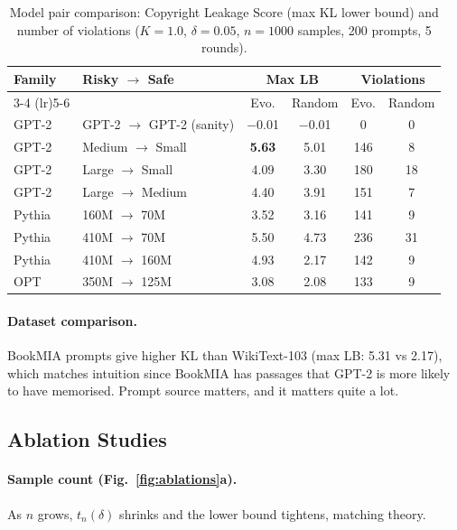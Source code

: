 \documentclass{article}
\begin{document}
\begin{table}[t]
\centering
\caption{Model pair comparison: Copyright Leakage Score (max KL lower bound) and number of violations ($K=1.0$, $\delta=0.05$, $n=1000$ samples, 200 prompts, 5 rounds).}
\label{tab:modelpairs}
\small
\begin{tabular}{@{}llcccc@{}}
\toprule
\textbf{Family} & \textbf{Risky $\to$ Safe} & \multicolumn{2}{c}{\textbf{Max LB}} & \multicolumn{2}{c}{\textbf{Violations}} \\
\cmidrule(lr){3-4} \cmidrule(lr){5-6}
 & & Evo. & Random & Evo. & Random \\
\midrule
GPT-2 & GPT-2 $\to$ GPT-2 (sanity) & $-$0.01 & $-$0.01 & 0 & 0 \\
GPT-2 & Medium $\to$ Small & \textbf{5.63} & 5.01 & 146 & 8 \\
GPT-2 & Large $\to$ Small & 4.09 & 3.30 & 180 & 18 \\
GPT-2 & Large $\to$ Medium & 4.40 & 3.91 & 151 & 7 \\
\midrule
Pythia & 160M $\to$ 70M & 3.52 & 3.16 & 141 & 9 \\
Pythia & 410M $\to$ 70M & 5.50 & 4.73 & 236 & 31 \\
Pythia & 410M $\to$ 160M & 4.93 & 2.17 & 142 & 9 \\
\midrule
OPT & 350M $\to$ 125M & 3.08 & 2.08 & 133 & 9 \\
\bottomrule
\end{tabular}
\end{table}


\paragraph{Dataset comparison.} BookMIA prompts give higher KL than WikiText-103 (max LB: 5.31 vs 2.17), which matches intuition since BookMIA has passages that GPT-2 is more likely to have memorised. Prompt source matters, and it matters quite a lot.


\subsection{Ablation Studies}

\paragraph{Sample count (Fig.~\ref{fig:ablations}a).} As $n$ grows, $t_n(\delta)$ shrinks and the lower bound tightens, matching theory.
\end{document}
